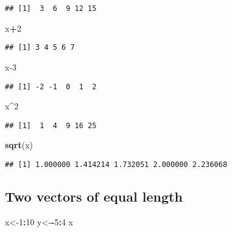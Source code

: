 \documentclass[
]{article}
\newenvironment{Shaded}{\begin{snugshade}}{\end{snugshade}}
\newcommand{\DecValTok}[1]{\textcolor[rgb]{0.00,0.00,0.81}{#1}}
\newcommand{\FunctionTok}[1]{\textcolor[rgb]{0.13,0.29,0.53}{\textbf{#1}}}
\newcommand{\NormalTok}[1]{#1}
\newcommand{\OtherTok}[1]{\textcolor[rgb]{0.56,0.35,0.01}{#1}}
\newcommand{\SpecialCharTok}[1]{\textcolor[rgb]{0.81,0.36,0.00}{\textbf{#1}}}
\begin{document}
\begin{verbatim}
## [1]  3  6  9 12 15
\end{verbatim}

\begin{Shaded}
\begin{Highlighting}[]
\NormalTok{x}\SpecialCharTok{+}\DecValTok{2}
\end{Highlighting}
\end{Shaded}

\begin{verbatim}
## [1] 3 4 5 6 7
\end{verbatim}

\begin{Shaded}
\begin{Highlighting}[]
\NormalTok{x}\DecValTok{{-}3}
\end{Highlighting}
\end{Shaded}

\begin{verbatim}
## [1] -2 -1  0  1  2
\end{verbatim}

\begin{Shaded}
\begin{Highlighting}[]
\NormalTok{x}\SpecialCharTok{\^{}}\DecValTok{2}
\end{Highlighting}
\end{Shaded}

\begin{verbatim}
## [1]  1  4  9 16 25
\end{verbatim}

\begin{Shaded}
\begin{Highlighting}[]
\FunctionTok{sqrt}\NormalTok{(x)}
\end{Highlighting}
\end{Shaded}

\begin{verbatim}
## [1] 1.000000 1.414214 1.732051 2.000000 2.236068
\end{verbatim}

\subsection{Two vectors of equal
length}\label{two-vectors-of-equal-length}

\begin{Shaded}
\begin{Highlighting}[]
\NormalTok{x}\OtherTok{\textless{}{-}}\DecValTok{1}\SpecialCharTok{:}\DecValTok{10}
\NormalTok{y}\OtherTok{\textless{}{-}}\SpecialCharTok{{-}}\DecValTok{5}\SpecialCharTok{:}\DecValTok{4}
\NormalTok{x}
\end{Highlighting}
\end{Shaded}
\end{document}

